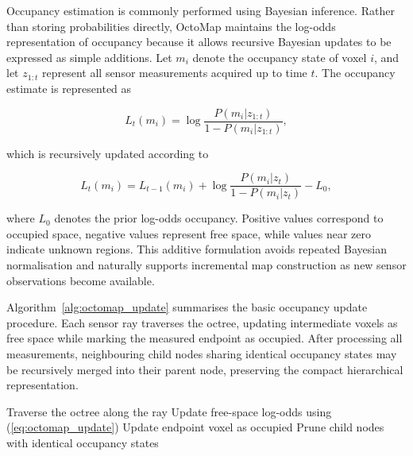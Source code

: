 \documentclass[11pt,oneside,openany]{book}
\begin{document}
Occupancy estimation is commonly performed using Bayesian inference. Rather than storing probabilities directly, OctoMap maintains the log-odds representation of occupancy because it allows recursive Bayesian updates to be expressed as simple additions. Let $m_i$ denote the occupancy state of voxel $i$, and let $z_{1:t}$ represent all sensor measurements acquired up to time $t$. The occupancy estimate is represented as

\begin{equation}
L_t(m_i)
=
\log
\frac{P(m_i|z_{1:t})}
     {1-P(m_i|z_{1:t})},
\label{eq:octomap_logodds}
\end{equation}

which is recursively updated according to

\begin{equation}
L_t(m_i)
=
L_{t-1}(m_i)
+
\log
\frac{P(m_i|z_t)}
     {1-P(m_i|z_t)}
-
L_0,
\label{eq:octomap_update}
\end{equation}

where $L_0$ denotes the prior log-odds occupancy. Positive values correspond to occupied space, negative values represent free space, while values near zero indicate unknown regions. This additive formulation avoids repeated Bayesian normalisation and naturally supports incremental map construction as new sensor observations become available.

Algorithm~\ref{alg:octomap_update} summarises the basic occupancy update procedure. Each sensor ray traverses the octree, updating intermediate voxels as free space while marking the measured endpoint as occupied. After processing all measurements, neighbouring child nodes sharing identical occupancy states may be recursively merged into their parent node, preserving the compact hierarchical representation.

\begin{algorithm}[t]
\caption{Incremental Probabilistic OctoMap Update}
\label{alg:octomap_update}
\begin{algorithmic}[1]
    \State Traverse the octree along the ray
        \State Update free-space log-odds using (\ref{eq:octomap_update})
    \EndFor
    \State Update endpoint voxel as occupied
\EndFor
\State Prune child nodes with identical occupancy states
\end{algorithmic}
\end{algorithm}
\end{document}
